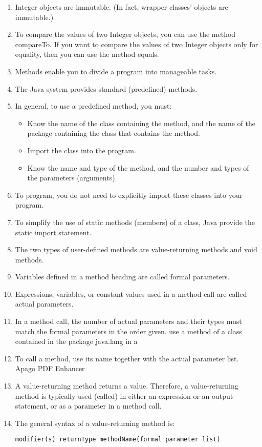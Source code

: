 \documentclass[12pt,a4paper,final,twoside,onecolumn,titlepage]{book}
\begin{document}
\begin{enumerate}
\item Integer objects are immutable. (In fact, wrapper classes’ objects are immutable.)
\item To compare the values of two Integer objects, you can use the method compareTo. If you want to compare the values of two Integer objects only for equality, then you can use the method equals.
\item Methods enable you to divide a program into manageable tasks.
\item The Java system provides standard (predefined) methods.
\item In general, to use a predefined method, you must:
\begin{itemize}
\item Know the name of the class containing the method, and the name of the package containing the class that contains the method.
\item Import the class into the program.
\item Know the name and type of the method, and the number and types of the parameters (arguments).
\end{itemize}
\item To program, you do not need to explicitly import these classes into your program.
\item To simplify the use of static methods (members) of a class, Java provide the static import statement.
\item The two types of user-defined methods are value-returning methods and void methods.
\item Variables defined in a method heading are called formal parameters.
\item Expressions, variables, or constant values used in a method call are called actual parameters.
\item In a method call, the number of actual parameters and their types must match the formal parameters in the order given.
use a method of a class contained in the package java.lang in a
\item To call a method, use its name together with the actual parameter list. Apago PDF Enhancer
\item A value-returning method returns a value. Therefore, a value-returning method is typically used (called) in either an expression or an output statement, or as a parameter in a method call.
\item The general syntax of a value-returning method is:
\begin{lstlisting}
modifier(s) returnType methodName(formal parameter list)

\end{lstlisting}
\end{enumerate}
\end{document}
